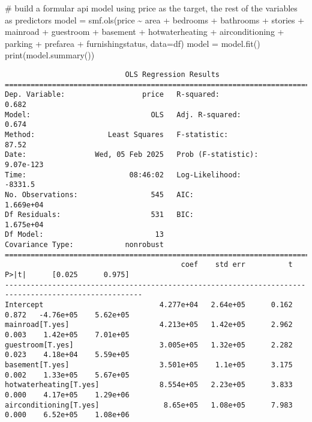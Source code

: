 \documentclass[
  letterpaper,
  DIV=11,
  numbers=noendperiod]{scrreprt}
\newenvironment{Shaded}{\begin{snugshade}}{\end{snugshade}}
\newcommand{\BuiltInTok}[1]{\textcolor[rgb]{0.00,0.23,0.31}{#1}}
\newcommand{\CommentTok}[1]{\textcolor[rgb]{0.37,0.37,0.37}{#1}}
\newcommand{\NormalTok}[1]{\textcolor[rgb]{0.00,0.23,0.31}{#1}}
\newcommand{\OperatorTok}[1]{\textcolor[rgb]{0.37,0.37,0.37}{#1}}
\newcommand{\StringTok}[1]{\textcolor[rgb]{0.13,0.47,0.30}{#1}}
\begin{document}
\begin{Shaded}
\begin{Highlighting}[]
\CommentTok{\# build a formular api model using price as the target, the rest of the variables as predictors}
\NormalTok{model }\OperatorTok{=}\NormalTok{ smf.ols(}\StringTok{\textquotesingle{}price \textasciitilde{} area + bedrooms + bathrooms + stories + mainroad + guestroom + basement + hotwaterheating + airconditioning + parking + prefarea + furnishingstatus\textquotesingle{}}\NormalTok{, data}\OperatorTok{=}\NormalTok{df)}
\NormalTok{model }\OperatorTok{=}\NormalTok{ model.fit()}
\BuiltInTok{print}\NormalTok{(model.summary())}
\end{Highlighting}
\end{Shaded}

\begin{verbatim}
                            OLS Regression Results                            
==============================================================================
Dep. Variable:                  price   R-squared:                       0.682
Model:                            OLS   Adj. R-squared:                  0.674
Method:                 Least Squares   F-statistic:                     87.52
Date:                Wed, 05 Feb 2025   Prob (F-statistic):          9.07e-123
Time:                        08:46:02   Log-Likelihood:                -8331.5
No. Observations:                 545   AIC:                         1.669e+04
Df Residuals:                     531   BIC:                         1.675e+04
Df Model:                          13                                         
Covariance Type:            nonrobust                                         
======================================================================================================
                                         coef    std err          t      P>|t|      [0.025      0.975]
------------------------------------------------------------------------------------------------------
Intercept                           4.277e+04   2.64e+05      0.162      0.872   -4.76e+05    5.62e+05
mainroad[T.yes]                     4.213e+05   1.42e+05      2.962      0.003    1.42e+05    7.01e+05
guestroom[T.yes]                    3.005e+05   1.32e+05      2.282      0.023    4.18e+04    5.59e+05
basement[T.yes]                     3.501e+05    1.1e+05      3.175      0.002    1.33e+05    5.67e+05
hotwaterheating[T.yes]              8.554e+05   2.23e+05      3.833      0.000    4.17e+05    1.29e+06
airconditioning[T.yes]               8.65e+05   1.08e+05      7.983      0.000    6.52e+05    1.08e+06

\end{verbatim}
\end{document}

